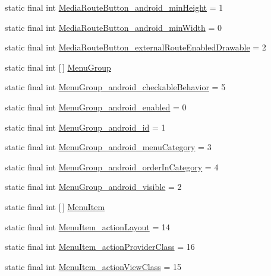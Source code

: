 \begin{DoxyCompactItemize}
static final int \hyperlink{classproject4_1_1xaria_1_1R_1_1styleable_a986fd72a47ce21b2c727eaba93fd24a9}{Media\+Route\+Button\+\_\+android\+\_\+min\+Height} = 1
\item 
static final int \hyperlink{classproject4_1_1xaria_1_1R_1_1styleable_a920044221a11dc23836e7a493af16c5b}{Media\+Route\+Button\+\_\+android\+\_\+min\+Width} = 0
\item 
static final int \hyperlink{classproject4_1_1xaria_1_1R_1_1styleable_a91bce24bc490f2bcbffa0eb9d2c6e8f4}{Media\+Route\+Button\+\_\+external\+Route\+Enabled\+Drawable} = 2
\item 
static final int \mbox{[}$\,$\mbox{]} \hyperlink{classproject4_1_1xaria_1_1R_1_1styleable_ae48043cd359a2d376fa65b4af13eca9a}{Menu\+Group}
\item 
static final int \hyperlink{classproject4_1_1xaria_1_1R_1_1styleable_a42649ced9274b4efe7927b3f3b772144}{Menu\+Group\+\_\+android\+\_\+checkable\+Behavior} = 5
\item 
static final int \hyperlink{classproject4_1_1xaria_1_1R_1_1styleable_aab11de43b52f47075f886635de3205c7}{Menu\+Group\+\_\+android\+\_\+enabled} = 0
\item 
static final int \hyperlink{classproject4_1_1xaria_1_1R_1_1styleable_a640dfef25dc9726381405f90ea7a87a2}{Menu\+Group\+\_\+android\+\_\+id} = 1
\item 
static final int \hyperlink{classproject4_1_1xaria_1_1R_1_1styleable_aead14cbe860986024e8f6cbd4d09655a}{Menu\+Group\+\_\+android\+\_\+menu\+Category} = 3
\item 
static final int \hyperlink{classproject4_1_1xaria_1_1R_1_1styleable_a7352099be18dea8bbb19d98372d2b1ee}{Menu\+Group\+\_\+android\+\_\+order\+In\+Category} = 4
\item 
static final int \hyperlink{classproject4_1_1xaria_1_1R_1_1styleable_a8c41524dbd054ca8362714efbaa75719}{Menu\+Group\+\_\+android\+\_\+visible} = 2
\item 
static final int \mbox{[}$\,$\mbox{]} \hyperlink{classproject4_1_1xaria_1_1R_1_1styleable_a8a573827fcaba6497e560662224b5530}{Menu\+Item}
\item 
static final int \hyperlink{classproject4_1_1xaria_1_1R_1_1styleable_a1915ac7c3d21f624b8be98708d0a6d98}{Menu\+Item\+\_\+action\+Layout} = 14
\item 
static final int \hyperlink{classproject4_1_1xaria_1_1R_1_1styleable_a93fe7ce7481403c9886e9ee5cc2e76b7}{Menu\+Item\+\_\+action\+Provider\+Class} = 16
\item 
static final int \hyperlink{classproject4_1_1xaria_1_1R_1_1styleable_a7bbb347655e3e3a9ddf30dbb7bcc6a18}{Menu\+Item\+\_\+action\+View\+Class} = 15

\end{DoxyCompactItemize}
